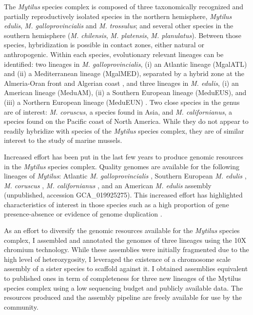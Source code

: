 \documentclass[11pt, a4paper]{article}
\begin{document}
The \textit{Mytilus} species complex is composed of three taxonomically recognized and partially reproductively isolated species in the northern hemisphere,
\textit{Mytilus edulis}, \textit{M. galloprovincialis} and \textit{M. trossulus}; and several other species in the southern hemisphere (\textit{M. chilensis}, \textit{M. platensis}, \textit{M. planulatus}).
Between those species, hybridization is possible in contact zones, either natural or anthropogenic.
Within each species, evolutionary relevant lineages can be identified:
two lineages in \textit{M. galloprovincialis}, (i)  an Atlantic lineage (MgalATL) and (ii) a Mediterranean lineage (MgalMED), separated by a hybrid zone at the Almeria-Oran front and Algerian coast \parencite{Quesada1995, Fraisse2016a, ElAyari2019}, and
three lineages in \textit{M. edulis}, (i) an American lineage (MeduAM), (ii) a Southern European lineage (MeduEUS), and (iii) a Northern European lineage (MeduEUN) \parencite{Fraisse2016a, Simon2020}.
Two close species in the genus are of interest: \textit{M. coruscus}, a species found in Asia, and \textit{M. californianus}, a species found on the Pacific coast of North America. While they do not appear to readily hybridize with species of the \textit{Mytilus} species complex, they are of similar interest to the study of marine mussels.

Increased effort has been put in the last few years to produce genomic resources in the \textit{Mytilus} species complex.
Quality genomes are available for the following lineages of \textit{Mytilus}: 
Atlantic \textit{M. galloprovincialis} \parencite{Gerdol2020},
Southern European \textit{M. edulis} \parencite{Corrochano-Fraile2022}, 
\textit{M. coruscus} \parencite{Yang2021, Li2020}, 
\textit{M. californianus} \parencite{Paggeot2022},
and an American \textit{M. edulis} assembly (unpublished, accession GCA\_019925275).
This increased effort has highlighted characteristics of interest in those species such as a high proportion of gene presence-absence \parencite{Gerdol2020} or evidence of genome duplication \parencite{Corrochano-Fraile2022}.

As an effort to diversify the genomic resources available for the \textit{Mytilus} species complex,
I assembled and annotated the genomes of three lineages using the 10X chromium technology.
While these assemblies were initially fragmented due to the high level of heterozygosity,
I leveraged the existence of a chromosome scale assembly of a sister species to scaffold against it.
I obtained assemblies equivalent to published ones in term of completeness for three new lineages of the Mytilus species complex using a low sequencing budget and publicly available data.
The resources produced and the assembly pipeline are freely available for use by the community.
\end{document}
